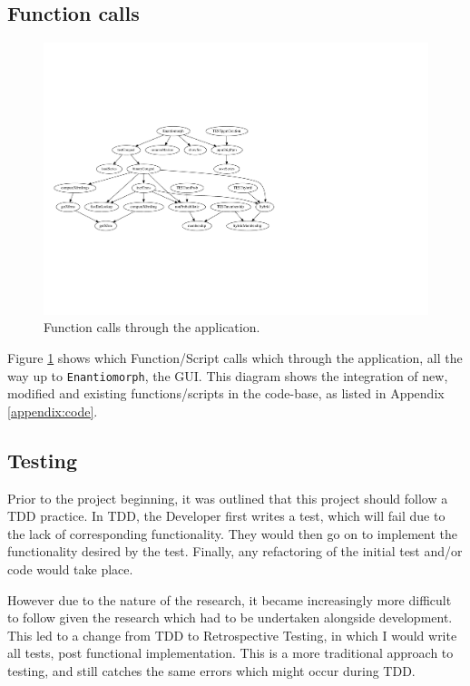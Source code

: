 \subsection{Function calls}

\begin{figure}[H]
  \centering
  \includegraphics[width=\textwidth,clip,trim=0mm 50mm 110mm 50mm]{Chapter2/software-img/function_call_1.pdf}
  \caption{Function calls through the application.}
  \label{fig:data-flow}
\end{figure}

Figure \ref{fig:data-flow} shows which Function/Script calls which through the application, all the way up to \texttt{Enantiomorph}, the \acrshort{GUI}. This diagram shows the integration of new, modified and existing functions/scripts in the code-base, as listed in Appendix \ref{appendix:code}.

\subsection{Testing}

Prior to the project beginning, it was outlined that this project should follow a \acrshort{TDD} practice. In \acrshort{TDD}, the Developer first writes a test, which will fail due to the lack of corresponding functionality. They would then go on to implement the functionality desired by the test. Finally, any refactoring of the initial test and/or code would take place.

However due to the nature of the research, it became increasingly more difficult to follow given the research which had to be undertaken alongside development. This led to a change from \acrshort{TDD} to Retrospective Testing, in which I would write all tests, post functional implementation. This is a more traditional approach to testing, and still catches the same errors which might occur during \acrshort{TDD}.

